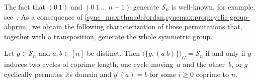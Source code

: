 The fact that $(0 ~ 1)$ and $(0 ~ 1 ~ \ldots ~ n - 1)$
generate $\mathcal S_n$ is well-known, for example, 
see~\cite{cameron_1999,dixon1996permutation}.
As a consequence of \cref{sync_max:thm:abJordan,syncmax:prop:cyclic-group-abprim},
we obtain the following characterization
of those permutations that, together with
a transposition, generate the whole symmetric group.

\begin{corollary}\label{sync_max:cor:cycletransgenerateSn}
	Let $g \in \mathcal S_n$ and $a,b \in [n]$ be distinct.
	Then $\langle \{ g, (a ~ b)\} \rangle_G = \mathcal S_n$
	if and only if $g$ induces two cycles of coprime length, one cycle moving~$a$ and the other~$b$,
	or $g$ cyclically permutes
	its domain and  $g^i(a) = b$
	for some $i \ge 0$ coprime to $n$. %
\end{corollary}